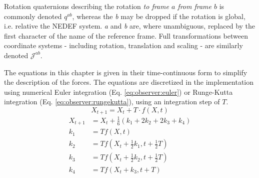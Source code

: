         Rotation quaternions describing the rotation \textit{to frame $a$ from frame $b$}
        is commonly denoted $q^{ab}$, whereas the \textit{b} may be dropped if the rotation is global, i.e. relative the NEDEF system.
        \textit{a} and \textit{b} are, where unambiguous, replaced by the first character of the
        name of the reference frame.
        Full transformations between coordinate systems - including rotation, translation and scaling -
        are similarly denoted $\mathcal{J}^{ab}$.

        The equations in this chapter is given in their time-continuous form
        to simplify the description of the forces.
        The equations are discretized in the implementation using numerical Euler integration (Eq. \eqref{eq:observer:euler})
        or Runge-Kutta integration (Eq. \eqref{eq:observer:rungekutta}), using an integration step of $T$.
        \begin{equation}
        \label{eq:observer:euler}
            X_{t+1} = X_{t} + T \cdot f(X,t)
        \end{equation}
        \begin{subequations}
        \label{eq:observer:rungekutta}
            \begin{align}
                X_{t+1} &= X_{t} + \tfrac{1}{6} \left(k_1 + 2k_2 + 2k_3 + k_4 \right) \\
                k_1 &= Tf(X, t) \\
                k_2 &= Tf(X_{t} + \tfrac{1}{2} k_1, t + \tfrac{1}{2}T) \\
                k_3 &= Tf(X_{t} + \tfrac{1}{2} k_2, t + \tfrac{1}{2}T) \\
                k_4 &= Tf(X_{t} + k_3, t + T)
            \end{align}
        \end{subequations}

